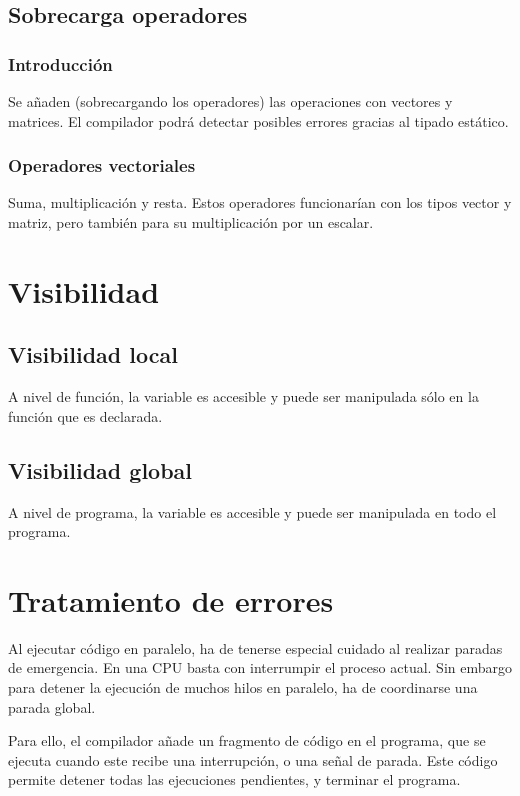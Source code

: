 \documentclass[12pt,a4paper]{article}
\begin{document}
\subsection
{Sobrecarga operadores}

\subsubsection{Introducción}
Se añaden (sobrecargando los operadores) las operaciones con vectores y
matrices. El compilador podrá detectar posibles errores gracias al tipado
estático.

\subsubsection{Operadores vectoriales}
Suma, multiplicación y resta. Estos operadores funcionarían con los tipos vector
y matriz, pero también para su multiplicación por un escalar.



\section{Visibilidad}

\subsection
{Visibilidad local}
A nivel de función, la variable es accesible y puede ser manipulada sólo en la
función que es declarada. 

\subsection
{Visibilidad global}
A nivel de programa, la variable es accesible y puede ser manipulada en todo el
programa.



\section{Tratamiento de errores}

Al ejecutar código en paralelo, ha de tenerse especial cuidado al realizar 
paradas de emergencia. En una CPU basta con interrumpir el proceso actual. Sin 
embargo para detener la ejecución de muchos hilos en paralelo, ha de coordinarse 
una parada global.

Para ello, el compilador añade un fragmento de código en el programa, que se 
ejecuta cuando este recibe una interrupción, o una señal de parada. Este código 
permite detener todas las ejecuciones pendientes, y terminar el programa.
\end{document}
